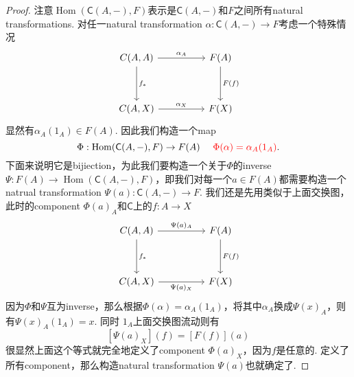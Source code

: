 \documentclass{article}
\newcommand*{\cat}[1]{\textsf{#1}\xspace}
\DeclareMathOperator{\Hom}{Hom}
\newcommand{\redt}[1]{\textcolor{red}{#1}}
\begin{document}
\begin{proof}
\rm 注意$\Hom(\cat{C}(A,-),F)$表示是$\cat{C}(A,-)$和$F$之间所有natural transformations. 对任一natural transformation $\alpha: \cat{C}(A,-) \to F$考虑一个特殊情况
$$
\begin{tikzcd}
{C(A,A)} \arrow[rr, "\alpha_A"] \arrow[dd,"f_*"] &  & F(A) \arrow[dd,"F(f)"] \\
                                           &  &                 \\
{C(A,X)} \arrow[rr,"\alpha_X"]                        &  & F(X)           
\end{tikzcd}
$$
显然有$\alpha_A(1_A) \in F(A)$. 因此我们构造一个map
$$
\Phi: \Hom(\cat{C}(A,-),F) \to F(A)~~~~\redt{\Phi(\alpha)=\alpha_A(1_A)}.
$$
下面来说明它是bijiection，为此我们要构造一个关于$\Phi$的inverse $\Psi: F(A) \to \Hom(\cat{C}(A,-),F)$，即我们对每一个$a \in F(A)$都需要构造一个natrual transformation $\Psi(a):\cat{C}(A,-) \to F$. 我们还是先用类似于上面交换图，此时的component $\Phi(a)_A$和$\cat{C}$上的$f:A \to X $
$$
\begin{tikzcd}
{C(A,A)} \arrow[rr, "\Psi(a)_A"] \arrow[dd, "f_*"] &  & F(A) \arrow[dd, "F(f)"] \\
                                                   &  &                         \\
{C(A,X)} \arrow[rr, "\Psi(a)_X"']                  &  & F(X)                   
\end{tikzcd}
$$
因为$\Phi$和$\Psi$互为inverse，那么根据$\Phi(\alpha) = \alpha_A(1_A)$，将其中$\alpha_A$换成$\Psi(x)_A$，则有$\Psi(x)_A(1_A) = x$. 同时
$1_A$上面交换图流动则有
$$
[\Psi(a)_X](f)=[F(f)](a)
$$
很显然上面这个等式就完全地定义了component $\Phi(a)_X$，因为$f$是任意的. 定义了所有component，那么构造natural transformation $\Psi(a)$也就确定了. 


\end{proof}
\end{document}
